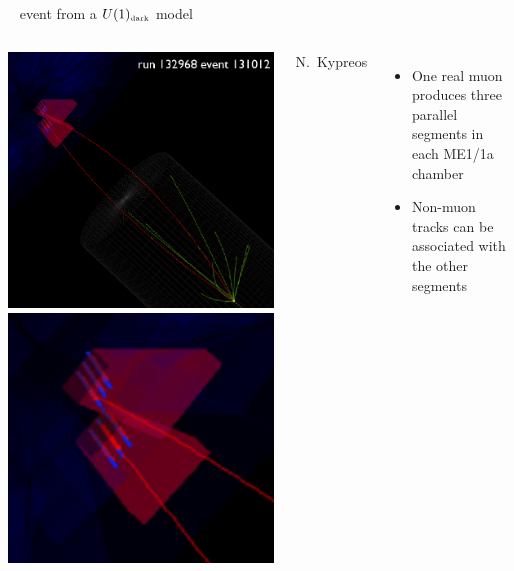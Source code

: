 \documentclass[compress]{beamer}
\begin{document}
\begin{frame}
\begin{columns}
\mbox{ } \hfill {\tiny event from a $U(1)_{\mbox{\tiny dark}}$ model} \hfill \mbox{ }
\end{columns}

\vfill
\begin{columns}

\includegraphics[height=3 cm]{triplet.png} \hfill \includegraphics[height=3 cm]{triplet_closeup.png}

\hfill \scriptsize N.\ Kypreos

\begin{itemize}
\item One real muon produces three parallel segments in each ME1/1a chamber

\item Non-muon tracks can be associated with the other segments
\end{itemize}
\end{columns}
\end{frame}
\end{document}
